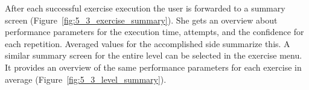 After each successful exercise execution the user is forwarded to a summary screen (Figure~\ref{fig:5_3_exercise_summary}).
She gets an overview about performance parameters for the execution time, attempts, and the confidence for each repetition. Averaged values for the accomplished side summarize this.
A similar summary screen for the entire level can be selected in the exercise menu. It provides an overview of the same performance parameters for each exercise in average (Figure~\ref{fig:5_3_level_summary}).


